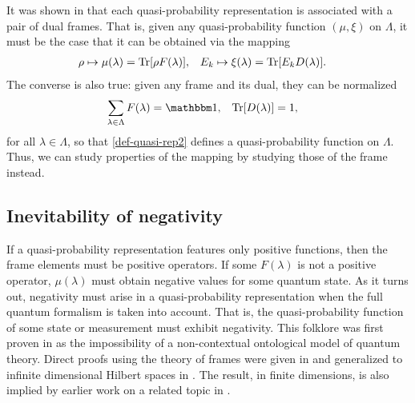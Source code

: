 It was shown in \cite{ferrie_frame_2008,ferrie_framed_2009,ferrie_necessity_2010} that each quasi-probability representation is associated with a pair of dual frames.  That is, given any quasi-probability function $(\mu,\xi)$ on $\Lambda$, it must be the case that it can be obtained via the mapping
\begin{align}\label{def-quasi-rep2}
\rho &\mapsto \mu(\lambda) = \Tr[\rho F(\lambda)], & E_k &\mapsto \xi(\lambda) = \Tr [E_k D(\lambda)].
\end{align}
The converse is also true: given any frame and its dual, they can be normalized
\begin{align}\label{def-quasi-rep-frame}
\sum_{\lambda \in \Lambda} F(\lambda) &= \id, & \Tr[D(\lambda)] &= 1,
\end{align}
for all $\lambda \in \Lambda$, so that \ref{def-quasi-rep2} defines a quasi-probability function on $\Lambda$. Thus, we can study properties of the mapping by studying those of the frame instead.

\subsection{Inevitability of negativity}

If a quasi-probability representation features only positive functions, then the frame elements must be positive operators.  If some $F(\lambda)$ is not a positive operator, $\mu(\lambda)$ must obtain negative values for some quantum state. As it turns out, negativity must arise in a quasi-probability representation when the full quantum formalism is taken into account. That is, the quasi-probability function of some state or measurement must exhibit negativity. This folklore was first proven in \cite{spekkens_negativity_2008} as the impossibility of a non-contextual ontological model of quantum theory. Direct proofs using the theory of
frames were given in  \cite{ferrie_frame_2008,ferrie_framed_2009} and
generalized to infinite dimensional Hilbert spaces in \cite
{ferrie_necessity_2010}. The result, in finite dimensions, is also implied by earlier work on a related topic in \cite{busch_classical_1993}.


